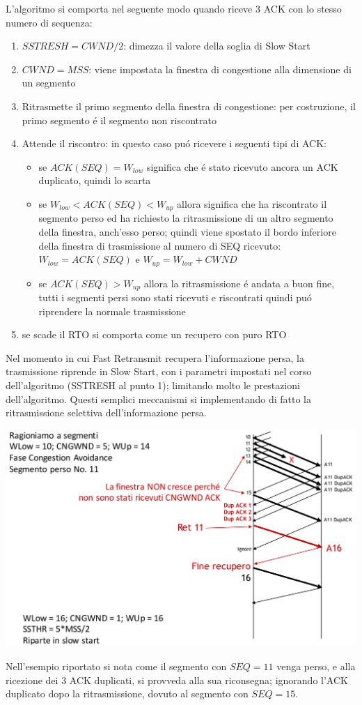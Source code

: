\documentclass[12pt]{article}
\begin{document}
L'algoritmo si comporta nel seguente modo quando riceve 3 ACK con lo stesso numero di sequenza:
\begin{enumerate}[noitemsep]
    \item $SSTRESH = CWND/2$: dimezza il valore della soglia di Slow Start
    \item $CWND = MSS$: viene impostata la finestra di congestione alla dimensione di un segmento
    \item Ritrasmette il primo segmento della finestra di congestione: per costruzione, il primo segmento \'e il 
          segmento non riscontrato
	\item Attende il riscontro: in questo caso pu\'o ricevere i seguenti tipi di ACK:
    \begin{itemize}[noitemsep]
    	\item se $ACK(SEQ) = W_{low}$ significa che \'e stato ricevuto ancora un ACK duplicato, quindi lo scarta
		\item se $W_{low} < ACK(SEQ) < W_{up}$ allora significa che ha riscontrato il segmento perso ed ha richiesto 
		      la ritrasmissione di un altro segmento della finestra, anch'esso perso; quindi viene spostato il bordo 
		      inferiore della finestra di trasmissione al numero di SEQ ricevuto: 
		      $W_{low} = ACK(SEQ)$ e $W_{up} = W_{low} + CWND$
	    \item se $ACK(SEQ) > W_{up}$ allora la ritrasmissione \'e andata a buon fine, tutti i segmenti
	          persi sono stati ricevuti e riscontrati quindi pu\'o riprendere la normale trasmissione
	\end{itemize}
	\item se scade il RTO si comporta come un recupero con puro RTO
\end{enumerate}
Nel momento in cui Fast Retransmit recupera l'informazione persa, la trasmissione riprende in Slow Start,
con i parametri impostati nel corso dell'algoritmo (SSTRESH al punto 1); limitando molto le
prestazioni dell'algoritmo. Questi semplici meccanismi si implementando di fatto la ritrasmissione selettiva 
dell'informazione persa.

\begin{center}
	\includegraphics[scale=0.35]{livello_trasporto-img12.png}
\end{center}
Nell'esempio riportato si nota come il segmento con $SEQ=11$ venga perso, e alla ricezione dei 3 ACK
duplicati, si provveda alla sua riconsegna; ignorando l'ACK duplicato dopo la ritrasmissione, dovuto
al segmento con $SEQ=15$. 
\end{document}
